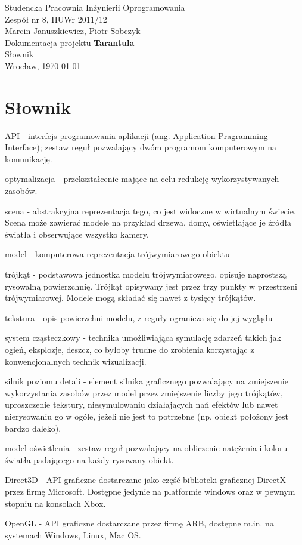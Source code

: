 \documentclass[11pt,leqno]{article}
\begin{document}
\begin{center}
\thispagestyle{empty}
{\Large Studencka Pracownia Inżynierii Oprogramowania}\\[0.5cm]
{\Large Zespół nr 8, IIUWr 2011/12}\\[2.5cm]

{\large Marcin Januszkiewicz, Piotr Sobczyk}\\[0.5cm]
{\huge Dokumentacja projektu \textbf{Tarantula}}\\[0.25cm]
{\huge Słownik}\\[0.5cm]
\vfill
{\large Wrocław, \today}
\end{center}

\newpage


\section{Słownik}

API - interfejs programowania aplikacji (ang. Application Pragramming Interface); zestaw reguł pozwalający dwóm programom komputerowym na komunikację.

optymalizacja - przekształcenie mające na celu redukcję wykorzystywanych zasobów.

scena - abstrakcyjna reprezentacja tego, co jest widoczne w wirtualnym świecie. Scena może zawierać modele na przykład drzewa, domy, oświetlające je źródła światła i obserwujące wszystko kamery.

model - komputerowa reprezentacja trójwymiarowego obiektu

trójkąt - podstawowa jednostka modelu trójwymiarowego, opisuje naprostszą rysowalną powierzchnię. Trójkąt opisywany jest przez trzy punkty w przestrzeni trójwymiarowej. Modele mogą składać się nawet z tysięcy trójkątów.

tekstura - opis powierzchni modelu, z reguły ogranicza się do jej wyglądu

system cząsteczkowy - technika umożliwiająca symulację zdarzeń takich jak ogień, eksplozje, deszcz, co byłoby trudne do zrobienia korzystając z konwencjonalnych technik wizualizacji.

silnik poziomu detali - element silnika graficznego pozwalający na zmiejszenie wykorzystania zasobów przez model przez zmiejszenie liczby jego trójkątów, uproszczenie tekstury, niesymulowaniu działających nań efektów lub nawet nierysowaniu go w ogóle, jeżeli nie jest to potrzebne (np. obiekt położony jest bardzo daleko).

model oświetlenia - zestaw reguł pozwalający na obliczenie natężenia i koloru światła padającego na każdy rysowany obiekt.

Direct3D - API graficzne dostarczane jako część biblioteki graficznej DirectX przez firmę Microsoft. Dostępne jedynie na platformie windows oraz w pewnym stopniu na konsolach Xbox.

OpenGL - API graficzne dostarczane przez firmę ARB, dostępne m.in. na systemach Windows, Linux, Mac OS.
\end{document}
